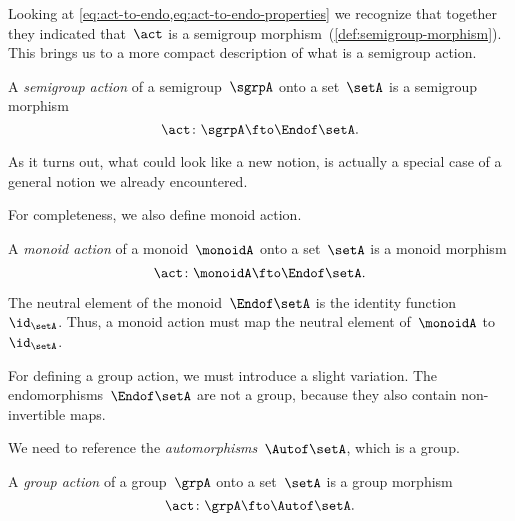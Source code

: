 Looking at \cref{eq:act-to-endo,eq:act-to-endo-properties} we recognize that together 
they indicated that~$\act$ is a semigroup morphism~(\cref{def:semigroup-morphism}). This brings us to a more compact description of what is a semigroup action. 

\begin{ctdefinition}\label{def:semigroup-action}
  A \emph{semigroup action} of a semigroup~$\sgrpA$ onto a set~$\setA$ is a semigroup morphism 
  \begin{equation}\label{eq:act-semigroup}
    \act \colon \sgrpA \fto \Endof\setA.
  \end{equation} 
\end{ctdefinition}

As it turns out, what could look like a new notion, is actually a special case of a general notion we already encountered. 

For completeness, we also define monoid action.

\begin{ctdefinition}\label{def:monoid-action}
  A \emph{monoid action} of a monoid~$\monoidA$ onto a set~$\setA$ is a monoid morphism 
  \begin{equation}\label{eq:act-monoid}
    \act \colon \monoidA \fto \Endof\setA.
  \end{equation} 
\end{ctdefinition}

The neutral element of the monoid~$\Endof\setA$ is the identity function~$\id_{\setA}$.
Thus, a monoid action must map the neutral element of~$\monoidA$ to~$\id_{\setA}$.

For defining a group action, we must introduce a slight variation.
The endomorphisms~$\Endof\setA$ are not a group, because they also contain non-invertible maps.

We need to reference the \emph{automorphisms}~$\Autof\setA$, which is a group.

\begin{ctdefinition}\label{def:group-action}
  A \emph{group action} of a group~$\grpA$ onto a set~$\setA$ is a group morphism 
  \begin{equation}\label{eq:act-group}
    \act \colon \grpA \fto \Autof\setA.
  \end{equation} 
\end{ctdefinition}






